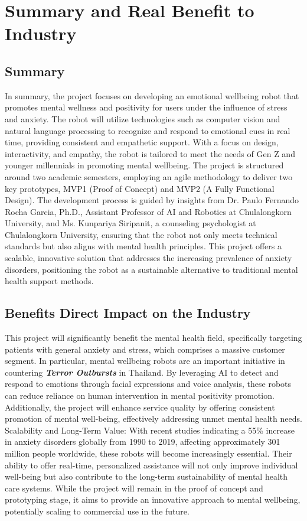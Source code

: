 \section{Summary and Real Benefit to Industry}
\subsection{Summary}
In summary, the project focuses on developing an emotional wellbeing robot that promotes mental wellness and positivity for users under the influence of stress and anxiety. The robot will utilize technologies such as computer vision and natural language processing to recognize and respond to emotional cues in real time, providing consistent and empathetic support. With a focus on design, interactivity, and empathy, the robot is tailored to meet the needs of Gen Z and younger millennials in promoting mental wellbeing. The project is structured around two academic semesters, employing an agile methodology to deliver two key prototypes, MVP1 (Proof of Concept) and MVP2 (A Fully Functional Design). The development process is guided by insights from Dr. Paulo Fernando Rocha Garcia, Ph.D., Assistant Professor of AI and Robotics at Chulalongkorn University, and Ms. Kunpariya Siripanit, a counseling psychologist at Chulalongkorn University, ensuring that the robot not only meets technical standards but also aligns with mental health principles. This project offers a scalable, innovative solution that addresses the increasing prevalence of anxiety disorders, positioning the robot as a sustainable alternative to traditional mental health support methods. 
\subsection{Benefits Direct Impact on the Industry}
This project will significantly benefit the mental health field, specifically targeting patients with general anxiety and stress, which comprises a massive customer segment. In particular, mental wellbeing robots are an important initiative in countering \textbf{\textit{Terror Outbursts}} in Thailand. By leveraging AI to detect and respond to emotions through facial expressions and voice analysis, these robots can reduce reliance on human intervention in mental positivity promotion. Additionally, the project will enhance service quality by offering consistent promotion of mental well-being, effectively addressing unmet mental health needs. Scalability and Long-Term Value: With recent studies indicating a 55\% increase in anxiety disorders globally from 1990 to 2019, affecting approximately 301 million people worldwide, these robots will become increasingly essential. Their ability to offer real-time, personalized assistance will not only improve individual well-being but also contribute to the long-term sustainability of mental health care systems. While the project will remain in the proof of concept and prototyping stage, it aims to provide an innovative approach to mental wellbeing, potentially scaling to commercial use in the future. 
